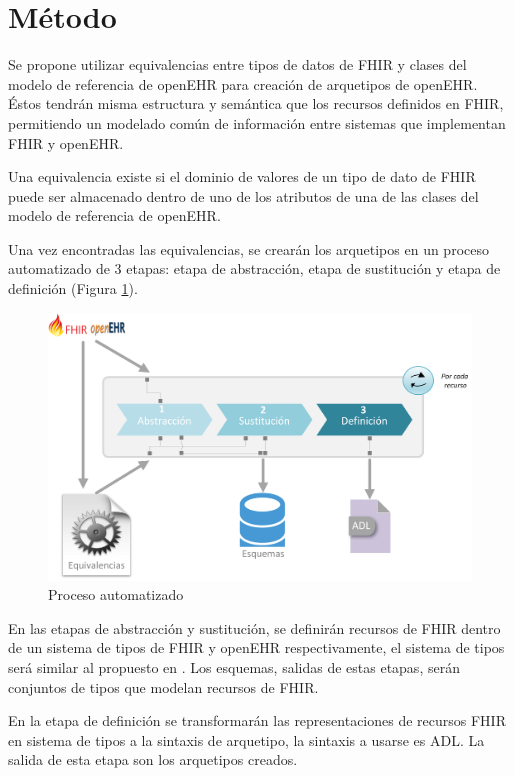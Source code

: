 \section{Método}

Se propone utilizar equivalencias entre tipos de datos de FHIR y clases del modelo de referencia de openEHR para creación de arquetipos de openEHR. Éstos tendrán misma estructura y semántica que los recursos definidos en FHIR, permitiendo un modelado común de información entre sistemas que implementan FHIR y openEHR.

Una equivalencia existe si el dominio de valores de un tipo de dato de FHIR puede ser almacenado dentro de uno de los atributos de una de las clases del modelo de referencia de openEHR.

Una vez encontradas las equivalencias, se crearán los arquetipos en un proceso automatizado de 3 etapas: etapa de abstracción, etapa de sustitución y etapa de definición (Figura \ref{fig:solution}).

\begin{figure}
  \includegraphics[scale=0.5]{./images/solution}
  \caption{Proceso automatizado}
  \label{fig:solution}
\end{figure}

En las etapas de abstracción y sustitución, se definirán recursos de FHIR dentro de un sistema de tipos de FHIR y openEHR respectivamente, el sistema de tipos será similar al propuesto en \cite{Maldonado09}. Los esquemas, salidas de estas etapas, serán conjuntos de tipos que modelan recursos de FHIR.

En la etapa de definición se transformarán las representaciones de recursos FHIR en sistema de tipos a la sintaxis de arquetipo, la sintaxis a usarse es ADL. La salida de esta etapa son los arquetipos creados.
